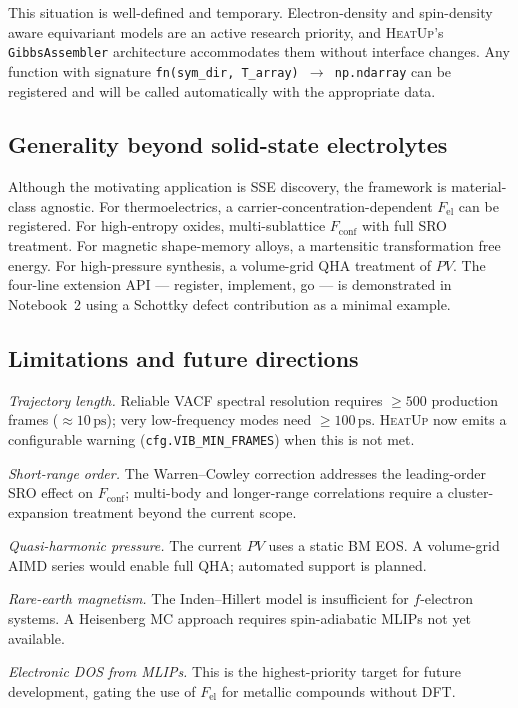 \documentclass[twocolumn,10pt]{article}
\newcommand{\Fel}{F_{\mathrm{el}}}
\newcommand{\Fconf}{F_{\mathrm{conf}}}
\newcommand{\tp}{\textsc{HeatUp}}
\begin{document}
This situation is well-defined and temporary.
Electron-density and spin-density aware equivariant
models\cite{batatia2022mace} are an active research priority, and \tp{}'s
\texttt{GibbsAssembler} architecture accommodates them without interface changes.
Any function with signature \texttt{fn(sym\_dir, T\_array)\,$\to$\,np.ndarray}
can be registered and will be called automatically with the appropriate data.

\subsection*{Generality beyond solid-state electrolytes}

Although the motivating application is SSE discovery\cite{lopezalvarez2024sse},
the framework is material-class agnostic.
For thermoelectrics, a carrier-concentration-dependent $\Fel$ can be registered.
For high-entropy oxides, multi-sublattice $\Fconf$ with full SRO treatment.
For magnetic shape-memory alloys, a martensitic transformation free energy.
For high-pressure synthesis, a volume-grid QHA treatment of $PV$.
The four-line extension API --- register, implement, go --- is demonstrated in
Notebook~2 using a Schottky defect contribution as a minimal example.

\subsection*{Limitations and future directions}

\emph{Trajectory length.} Reliable VACF spectral resolution requires
$\geq 500$ production frames ($\approx 10\,\mathrm{ps}$); very low-frequency
modes need $\geq 100\,\mathrm{ps}$. \tp{} now emits a configurable warning
(\texttt{cfg.VIB\_MIN\_FRAMES}) when this is not met.

\emph{Short-range order.} The Warren--Cowley correction addresses the leading-order
SRO effect on $\Fconf$; multi-body and longer-range correlations require a
cluster-expansion treatment\cite{vandermause2020fly} beyond the current scope.

\emph{Quasi-harmonic pressure.} The current $PV$ uses a static BM EOS.
A volume-grid AIMD series would enable full QHA; automated support is planned.

\emph{Rare-earth magnetism.} The Inden--Hillert model is insufficient for $f$-electron
systems. A Heisenberg MC approach requires spin-adiabatic MLIPs not yet available.

\emph{Electronic DOS from MLIPs.} This is the highest-priority target for future
development, gating the use of $\Fel$ for metallic compounds without DFT.
\end{document}
